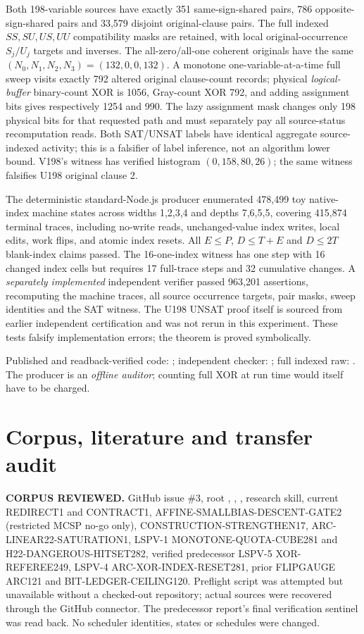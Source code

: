 \documentclass[11pt]{article}
\begin{document}
Both 198-variable sources have exactly 351 same-sign-shared pairs, 786 opposite-sign-shared pairs and 33,579 disjoint original-clause pairs. The full indexed $SS,SU,US,UU$ compatibility masks are retained, with local original-occurrence $S_j/U_j$ targets and inverses. The all-zero/all-one coherent originals have the same $(N_0,N_1,N_2,N_3)=(132,0,0,132)$. A monotone one-variable-at-a-time full sweep visits exactly 792 altered original clause-count records; physical \emph{logical-buffer} binary-count XOR is 1056, Gray-count XOR 792, and adding assignment bits gives respectively 1254 and 990. The lazy assignment mask changes only 198 physical bits for that requested path and must separately pay all source-status recomputation reads. Both SAT/UNSAT labels have identical aggregate source-indexed activity; this is a falsifier of label inference, not an algorithm lower bound. V198's witness has verified histogram $(0,158,80,26)$; the same witness falsifies U198 original clause 2.

The deterministic standard-Node.js producer enumerated 478,499 toy native-index machine states across widths 1,2,3,4 and depths 7,6,5,5, covering 415,874 terminal traces, including no-write reads, unchanged-value index writes, local edits, work flips, and atomic index resets. All $E\le P$, $D\le T+E$ and $D\le2T$ blank-index claims passed. The 16-one-index witness has one step with 16 changed index cells but requires 17 full-trace steps and 32 cumulative changes. A \emph{separately implemented} independent verifier passed 963,201 assertions, recomputing the machine traces, all source occurrence targets, pair masks, sweep identities and the SAT witness. The U198 UNSAT proof itself is sourced from earlier independent certification and was not rerun in this experiment. These tests falsify implementation errors; the theorem is proved symbolically.

Published and readback-verified code:
;
independent checker:
;
full indexed raw:
.
The producer is an \emph{offline auditor}; counting full XOR at run time would itself have to be charged.

\section{Corpus, literature and transfer audit}
\noindent\textbf{CORPUS REVIEWED.} GitHub issue \#3, root ,
, , research skill, current
REDIRECT1 and CONTRACT1, AFFINE-SMALLBIAS-DESCENT-GATE2
(restricted MCSP no-go only), CONSTRUCTION-STRENGTHEN17,
ARC-LINEAR22-SATURATION1, LSPV-1 MONOTONE-QUOTA-CUBE281 and
H22-DANGEROUS-HITSET282, verified predecessor LSPV-5 XOR-REFEREE249,
LSPV-4 ARC-XOR-INDEX-RESET281, prior FLIPGAUGE ARC121 and
BIT-LEDGER-CEILING120. Preflight script was attempted but unavailable
without a checked-out repository; actual sources were recovered
through the GitHub connector. The predecessor report's final
verification sentinel was read back. No scheduler identities, states
or schedules were changed.
\end{document}
